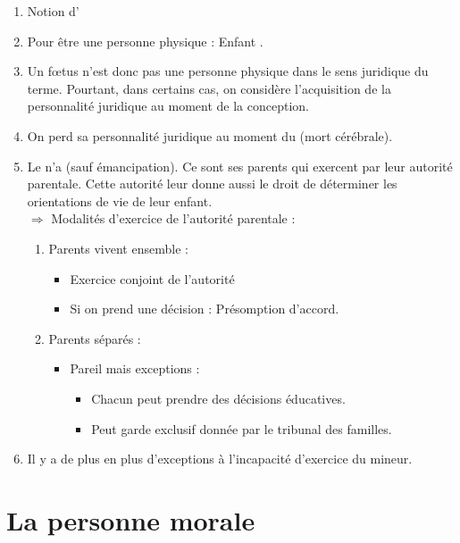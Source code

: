 \begin{enumerate}
    \item Notion d'
    \item Pour être une personne physique : Enfant .
    \item Un fœtus n'est donc pas une personne physique dans le sens juridique du terme. Pourtant, dans certains cas, on considère l'acquisition de la personnalité juridique au moment de la conception.
    \item On perd sa personnalité juridique au moment du  (mort cérébrale).
    \item Le  n'a  (sauf émancipation). Ce sont ses parents qui exercent par leur autorité parentale. Cette autorité leur donne aussi le droit de déterminer les orientations de vie de leur enfant. \\
    $\Rightarrow$ Modalités d'exercice de l'autorité parentale :
    \begin{enumerate}
        \item Parents vivent ensemble :
        \begin{itemize}
            \item Exercice conjoint de l'autorité
            \item Si on prend une décision : Présomption d'accord.
        \end{itemize}
        \item Parents séparés :
        \begin{itemize}
            \item Pareil mais exceptions :
            \begin{itemize}
                \item Chacun peut prendre des décisions éducatives.
                \item Peut garde exclusif donnée par le tribunal des familles.
             \end{itemize} 
        \end{itemize}
    \end{enumerate}
    \item Il y a de plus en plus d'exceptions à l'incapacité d'exercice du mineur.
\end{enumerate}

\section{La personne morale}

